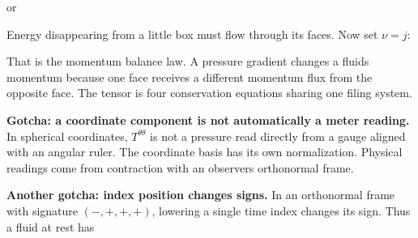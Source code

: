 \documentclass[
  11pt,
  letterpaper,
  oneside,
  openany]{scrbook}
\begin{document}
\begin{center}
\begingroup
{}
\ifdim\wd\grmathbox>\linewidth
\resizebox{\linewidth}{!}{\usebox{\grmathbox}}
\else\usebox{\grmathbox}\fi
\endgroup
\end{center}

or

\begin{center}
\begingroup
{}
\ifdim\wd\grmathbox>\linewidth
\resizebox{\linewidth}{!}{\usebox{\grmathbox}}
\else\usebox{\grmathbox}\fi
\endgroup
\end{center}

Energy disappearing from a little box must flow through its faces. Now
set \(\nu=j\):

\begin{center}
\begingroup
{}
\ifdim\wd\grmathbox>\linewidth
\resizebox{\linewidth}{!}{\usebox{\grmathbox}}
\else\usebox{\grmathbox}\fi
\endgroup
\end{center}

That is the momentum balance law. A pressure gradient changes a
fluid\textquotesingle s momentum because one face receives a different
momentum flux from the opposite face. The tensor is four conservation
equations sharing one filing system.

\textbf{Gotcha: a coordinate component is not automatically a meter
reading.} In spherical coordinates, \(T^{\theta\theta}\) is not a
pressure read directly from a gauge aligned with an angular ruler. The
coordinate basis has its own normalization. Physical readings come from
contraction with an observer\textquotesingle s orthonormal frame.

\textbf{Another gotcha: index position changes signs.} In an orthonormal
frame with signature \((-,+,+,+)\), lowering a single time index changes
its sign. Thus a fluid at rest has

\begin{center}
\begingroup
{}
\ifdim\wd\grmathbox>\linewidth
\resizebox{\linewidth}{!}{\usebox{\grmathbox}}
\else\usebox{\grmathbox}\fi
\endgroup
\end{center}
\end{document}
